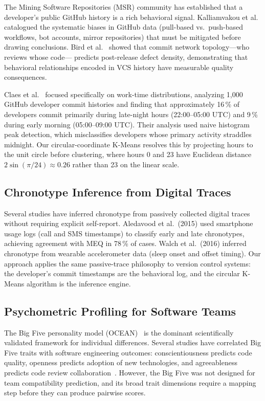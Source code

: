 \documentclass[conference]{IEEEtran}
\begin{document}
The Mining Software Repositories (MSR) community has established
that a developer's public GitHub history is a rich behavioral
signal.  Kalliamvakou et al.~\cite{kalliamvakou2014} catalogued
the systematic biases in GitHub data (pull-based vs.\ push-based
workflows, bot accounts, mirror repositories) that must be
mitigated before drawing conclusions.  Bird et al.~\cite{bird2009}
showed that commit network topology---who reviews whose code---
predicts post-release defect density, demonstrating that behavioral
relationships encoded in VCS history have measurable quality
consequences.

Claes et al.~\cite{claes2018} focused specifically on work-time
distributions, analyzing 1,000 GitHub developer commit histories and
finding that approximately 16\,\% of developers commit primarily
during late-night hours (22:00--05:00 UTC) and 9\,\% during early
morning (05:00--09:00 UTC).  Their analysis used naive histogram peak
detection, which misclassifies developers whose primary activity
straddles midnight.  Our circular-coordinate K-Means resolves this
by projecting hours to the unit circle before clustering, where
hours 0 and 23 have Euclidean distance $2\sin(\pi/24) \approx 0.26$
rather than 23 on the linear scale.

\subsection{Chronotype Inference from Digital Traces}

Several studies have inferred chronotype from passively collected
digital traces without requiring explicit self-report.
Aledavood et al.\ (2015) used smartphone usage logs (call and SMS
timestamps) to classify early and late chronotypes, achieving
agreement with MEQ in 78\,\% of cases.  Walch et al.\ (2016)
inferred chronotype from wearable accelerometer data (sleep onset
and offset timing).  Our approach applies the same passive-trace
philosophy to version control systems: the developer's commit
timestamps are the behavioral log, and the circular K-Means
algorithm is the inference engine.

\subsection{Psychometric Profiling for Software Teams}

The Big Five personality model (OCEAN)~\cite{mccrae1987} is the
dominant scientifically validated framework for individual
differences.  Several studies have correlated Big Five traits with
software engineering outcomes: conscientiousness predicts code
quality, openness predicts adoption of new technologies, and
agreeableness predicts code review collaboration~\cite{halfhill2005}.
However, the Big Five was not designed for team compatibility
prediction, and its broad trait dimensions require a mapping
step before they can produce pairwise scores.
\end{document}
